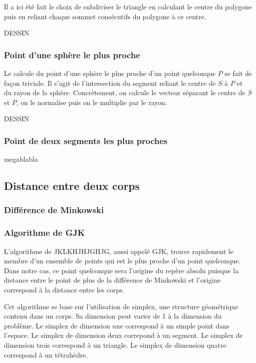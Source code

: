 \documentclass[twocolumn]{article}
\begin{document}
Il a ici été fait le choix de subdiviser le triangle en calculant le centre du polygone puis en reliant chaque sommet consécutifs du polygone à ce centre.

DESSIN

\subsubsection{Point d'une sphère le plus proche}

Le calcule du point d'une sphère le plus proche d'un point quelconque $P$ se fait de façon triviale. Il s'agit de l'intersection du segment reliant le centre de $S$ à $P$ et du rayon de la sphère. Concrètement, on calcule le vecteur séparant le centre de $S$ et $P$, on le normalise puis on le multiplie par le rayon.

DESSIN

\subsubsection{Point de deux segments les plus proches}

megablabla 

\subsection{Distance entre deux corps}

\subsubsection{Différence de Minkowski}

\subsubsection{Algorithme de GJK}

L'algorithme de JKLKHJHJGHJG, aussi appelé GJK, trouve rapidement le membre d'un ensemble de points qui est le plus proche d'un point quelconque. Dans notre cas, ce point quelconque sera l'origine du repère absolu puisque la distance entre le point de plus de la différence de Minkowski et l'origine correspond à la distance entre les corps.

Cet algorithme se base sur l'utilisation de simplex, une structure géométrique contenu dans un corps. Sa dimension peut varier de 1 à la dimension du problème. Le simplex de dimension une correspond à un simple point dans l'espace. Le simplex de dimension deux correpond à un segment. Le simplex de dimension trois correspond à un triangle. Le simplex de dimension quatre correspond à un tétrahèdre.
\end{document}
